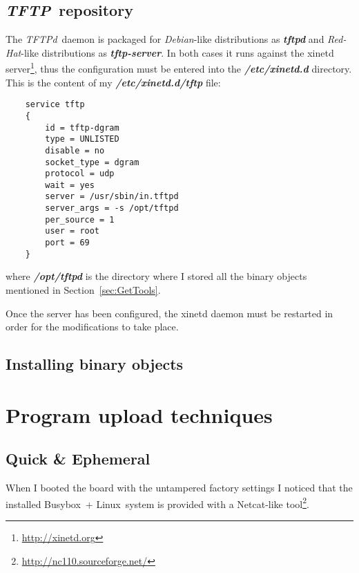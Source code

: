 \documentclass[10pt,a4paper]{article}
\newcommand{\FileName}[1]{\textbf{\textsl{\textsf{{#1}}}}}
\newcommand{\PackageName}[1]{\textbf{\textsl{\textsf{{#1}}}}}
\newcommand{\TechName}[1]{\textsf{{#1}}}
\newcommand{\ToolName}[1]{\emph{{#1}}}
\newcommand{\StdName}[1]{\emph{{#1}}}
\newcommand{\Linux}{\TechName{Linux}}
\newcommand{\BusyBox}{\TechName{Busybox}}
\newcommand{\NetCat}{\TechName{Netcat}}
\newcommand{\TFTPd}{\ToolName{TFTPd}}
\newcommand{\TFTP}{\StdName{TFTP}}
\begin{document}
        \subsection{ \TFTP\ repository }

            The \TFTPd\ daemon is packaged for \emph{Debian}-like
            distributions as \PackageName{tftpd} and \emph{Red-Hat}-like
            distributions as \PackageName{tftp-server}. In both cases it
            runs against the \TechName{xinetd} server\footnote{
                \url{http://xinetd.org}
            }, thus the configuration must be entered into the
            \FileName{/etc/xinetd.d} directory. This is the content of my
            \FileName{/etc/xinetd.d/tftp} file:
\begin{lstlisting}
    service tftp
    {
        id = tftp-dgram
        type = UNLISTED
        disable = no
        socket_type = dgram
        protocol = udp
        wait = yes
        server = /usr/sbin/in.tftpd
        server_args = -s /opt/tftpd
        per_source = 1
        user = root
        port = 69
    }
\end{lstlisting}
            where \FileName{/opt/tftpd} is the directory where I stored
            all the binary objects mentioned in
            Section~\ref{sec:GetTools}.

            Once the server has been configured, the \TechName{xinetd}
            daemon must be restarted in order for the modifications to
            take place.

        \subsection{ Installing binary objects }

    \section{ Program upload techniques }

        \subsection{ Quick \& Ephemeral }

            When I booted the board with the untampered factory settings I
            noticed that the installed \BusyBox\ + \Linux\ system is
            provided with a \NetCat-like tool\footnote{
                \url{http://nc110.sourceforge.net/}
            }.
\end{document}
